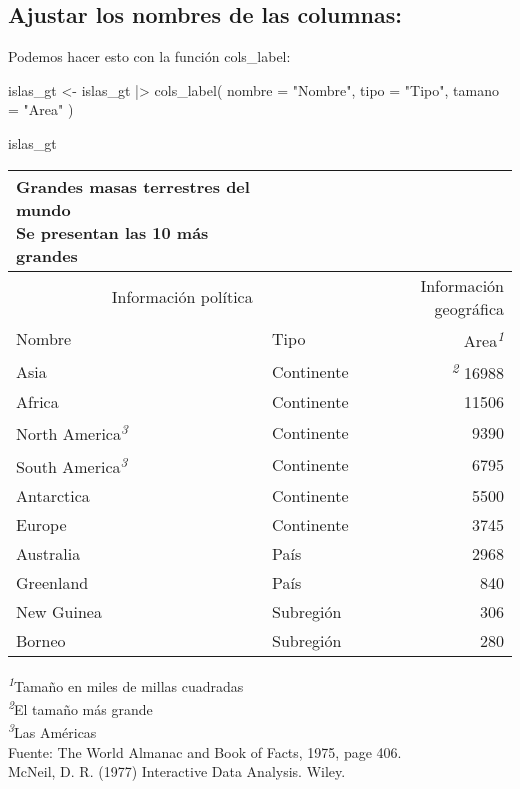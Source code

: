 \documentclass[
]{article}
\newenvironment{Shaded}{\begin{snugshade}}{\end{snugshade}}
\newcommand{\AttributeTok}[1]{\textcolor[rgb]{0.77,0.63,0.00}{#1}}
\newcommand{\FunctionTok}[1]{\textcolor[rgb]{0.00,0.00,0.00}{#1}}
\newcommand{\NormalTok}[1]{#1}
\newcommand{\OtherTok}[1]{\textcolor[rgb]{0.56,0.35,0.01}{#1}}
\newcommand{\SpecialCharTok}[1]{\textcolor[rgb]{0.00,0.00,0.00}{#1}}
\newcommand{\StringTok}[1]{\textcolor[rgb]{0.31,0.60,0.02}{#1}}
\begin{document}
\hypertarget{ajustar-los-nombres-de-las-columnas}{%
\subsection{Ajustar los nombres de las
columnas:}\label{ajustar-los-nombres-de-las-columnas}}

Podemos hacer esto con la función cols\_label:

\begin{Shaded}
\begin{Highlighting}[]
\NormalTok{islas\_gt }\OtherTok{\textless{}{-}}\NormalTok{ islas\_gt }\SpecialCharTok{|\textgreater{}} 
  \FunctionTok{cols\_label}\NormalTok{(}
    \AttributeTok{nombre =} \StringTok{"Nombre"}\NormalTok{,}
    \AttributeTok{tipo =} \StringTok{"Tipo"}\NormalTok{,}
    \AttributeTok{tamano =} \StringTok{"Area"}
\NormalTok{  )}

\NormalTok{islas\_gt}
\end{Highlighting}
\end{Shaded}

\setlength{\LTpost}{0mm}
\begin{longtable}{llr}
\caption*{
{\large Grandes masas terrestres del mundo} \\ 
{\small Se presentan las 10 más grandes}
} \\ 
\toprule
\multicolumn{2}{c}{Información política} & Información geográfica \\ 
\cmidrule(lr){1-2} \cmidrule(lr){3-3}
Nombre & Tipo & Area\textsuperscript{\textit{1}} \\ 
\midrule
Asia & Continente & \textsuperscript{\textit{2}} 16988 \\ 
Africa & Continente & 11506 \\ 
North America\textsuperscript{\textit{3}} & Continente & 9390 \\ 
South America\textsuperscript{\textit{3}} & Continente & 6795 \\ 
Antarctica & Continente & 5500 \\ 
Europe & Continente & 3745 \\ 
Australia & País & 2968 \\ 
Greenland & País & 840 \\ 
New Guinea & Subregión & 306 \\ 
Borneo & Subregión & 280 \\ 
\bottomrule
\end{longtable}
\begin{minipage}{\linewidth}
\textsuperscript{\textit{1}}Tamaño en miles de millas cuadradas\\
\textsuperscript{\textit{2}}El tamaño más grande\\
\textsuperscript{\textit{3}}Las Américas\\
Fuente: The World Almanac and Book of Facts, 1975, page 406.\\
McNeil, D. R. (1977) Interactive Data Analysis. Wiley.\\
\end{minipage}
\end{document}
